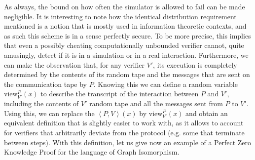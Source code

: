 \documentclass{article}
\begin{document}
As always, the bound on how often the simulator is allowed to fail can be made negligible.
It is interesting to note how the identical distribution requirement mentioned is a notion that is mostly used in information
theoretic contexts, and as such this scheme is in a sense perfectly secure. To be more precise, this implies that even
a possibly cheating computationally unbounded verifier cannot, quite amusingly, detect if it is in a simulation or in a real interaction.
Furthermore, we can make the observation that, for any verifier $V'$, its execution is completely determined by the contents of its random tape and the messages that
are sent on the communication tape by $P$. Knowing this we can define a random variable $\text{view}^{P}_{V'}(x)$ to describe the transcript of the interaction between $P$ and $V'$, including the contents of $V'$ random tape and all the messages sent from $P$ to $V'$.
Using this, we can replace the $\left<P, V\right>(x)$ by $\text{view}^{P}_{V'}(x)$ and obtain an equivalent definition that is slightly easier to work with, as it allows to account for verifiers that arbitrarily deviate from the protocol (e.g. some that terminate between steps).
With this definition, let us give now an example of a Perfect Zero Knowledge Proof for the language of Graph Isomorphism.
\end{document}
